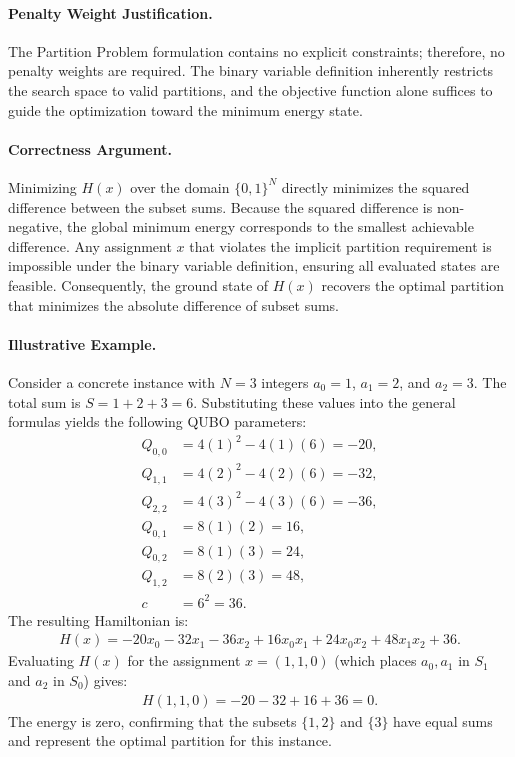 \documentclass[12pt]{article}
\begin{document}
\paragraph{Penalty Weight Justification.}
The Partition Problem formulation contains no explicit constraints; therefore, no penalty weights are required. The binary variable definition inherently restricts the search space to valid partitions, and the objective function alone suffices to guide the optimization toward the minimum energy state.

\paragraph{Correctness Argument.}
Minimizing $H(x)$ over the domain $\{0,1\}^N$ directly minimizes the squared difference between the subset sums. Because the squared difference is non-negative, the global minimum energy corresponds to the smallest achievable difference. Any assignment $x$ that violates the implicit partition requirement is impossible under the binary variable definition, ensuring all evaluated states are feasible. Consequently, the ground state of $H(x)$ recovers the optimal partition that minimizes the absolute difference of subset sums.

\paragraph{Illustrative Example.}
Consider a concrete instance with $N=3$ integers $a_0=1$, $a_1=2$, and $a_2=3$. The total sum is $S = 1+2+3 = 6$. Substituting these values into the general formulas yields the following QUBO parameters:
\begin{align}
    Q_{0,0} &= 4(1)^2 - 4(1)(6) = -20, \\
    Q_{1,1} &= 4(2)^2 - 4(2)(6) = -32, \\
    Q_{2,2} &= 4(3)^2 - 4(3)(6) = -36, \\
    Q_{0,1} &= 8(1)(2) = 16, \\
    Q_{0,2} &= 8(1)(3) = 24, \\
    Q_{1,2} &= 8(2)(3) = 48, \\
    c &= 6^2 = 36.
\end{align}
The resulting Hamiltonian is:
\begin{align}
    H(x) = -20x_0 - 32x_1 - 36x_2 + 16x_0x_1 + 24x_0x_2 + 48x_1x_2 + 36.
\end{align}
Evaluating $H(x)$ for the assignment $x = (1, 1, 0)$ (which places $a_0, a_1$ in $S_1$ and $a_2$ in $S_0$) gives:
\begin{align}
    H(1,1,0) = -20 - 32 + 16 + 36 = 0.
\end{align}
The energy is zero, confirming that the subsets $\{1, 2\}$ and $\{3\}$ have equal sums and represent the optimal partition for this instance.
\end{document}
